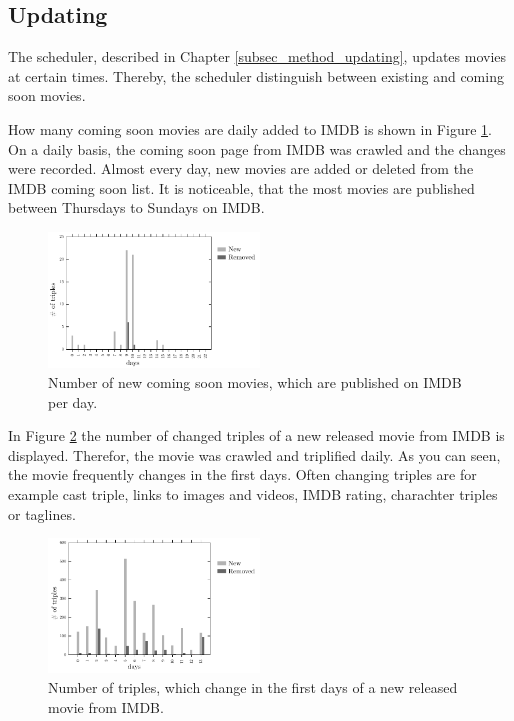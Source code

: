 \subsection{Updating}
\label{subsec_evaluation_updating}

The scheduler, described in Chapter \ref{subsec_method_updating}, updates movies at certain times.
Thereby, the scheduler distinguish between existing and coming soon movies.

How many coming soon movies are daily added to IMDB is shown in Figure \ref{fig_coming_soon_movie}.
On a daily basis, the coming soon page from IMDB was crawled and the changes were recorded.
Almost every day, new movies are added or deleted from the IMDB coming soon list.
It is noticeable, that the most movies are published between Thursdays to Sundays on IMDB.

\begin{figure}[ht]
  \begin{center}
  \includegraphics[width=0.5\textwidth]{images/updating_1.pdf}
  \end{center}
  \caption{Number of new coming soon movies, which are published on IMDB per day.}
  \label{fig_coming_soon_movie}
\end{figure}

In Figure \ref{fig_new_movie} the number of changed triples of a new released movie from IMDB is displayed.
Therefor, the movie was crawled and triplified daily.
As you can seen, the movie frequently changes in the first days.
Often changing triples are for example cast triple, links to images and videos, IMDB rating, charachter triples or taglines.

\begin{figure}[ht]
  \begin{center}
  \includegraphics[width=0.5\textwidth]{images/updating_2.pdf}
  \end{center}
  \caption{Number of triples, which change in the first days of a new released movie from IMDB.}
  \label{fig_new_movie}
\end{figure}